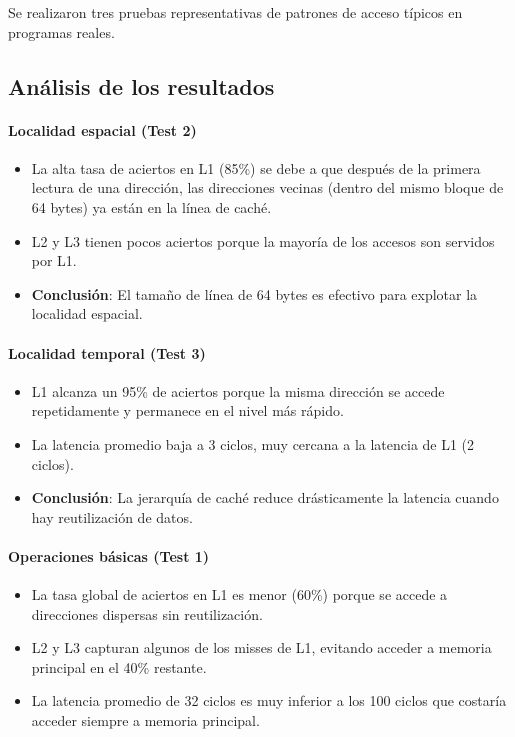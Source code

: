 \documentclass[12pt, letterpaper]{article}
\begin{document}
Se realizaron tres pruebas representativas de patrones de acceso típicos en programas reales.

\subsection{Análisis de los resultados}

\paragraph{Localidad espacial (Test 2)}
\begin{itemize}
    \item La alta tasa de aciertos en L1 (85\%) se debe a que después de la primera lectura de una dirección, las direcciones vecinas (dentro del mismo bloque de 64 bytes) ya están en la línea de caché.
    \item L2 y L3 tienen pocos aciertos porque la mayoría de los accesos son servidos por L1.
    \item \textbf{Conclusión}: El tamaño de línea de 64 bytes es efectivo para explotar la localidad espacial.
\end{itemize}

\paragraph{Localidad temporal (Test 3)}
\begin{itemize}
    \item L1 alcanza un 95\% de aciertos porque la misma dirección se accede repetidamente y permanece en el nivel más rápido.
    \item La latencia promedio baja a 3 ciclos, muy cercana a la latencia de L1 (2 ciclos).
    \item \textbf{Conclusión}: La jerarquía de caché reduce drásticamente la latencia cuando hay reutilización de datos.
\end{itemize}

\paragraph{Operaciones básicas (Test 1)}
\begin{itemize}
    \item La tasa global de aciertos en L1 es menor (60\%) porque se accede a direcciones dispersas sin reutilización.
    \item L2 y L3 capturan algunos de los misses de L1, evitando acceder a memoria principal en el 40\% restante.
    \item La latencia promedio de 32 ciclos es muy inferior a los 100 ciclos que costaría acceder siempre a memoria principal.
\end{itemize}
\end{document}
